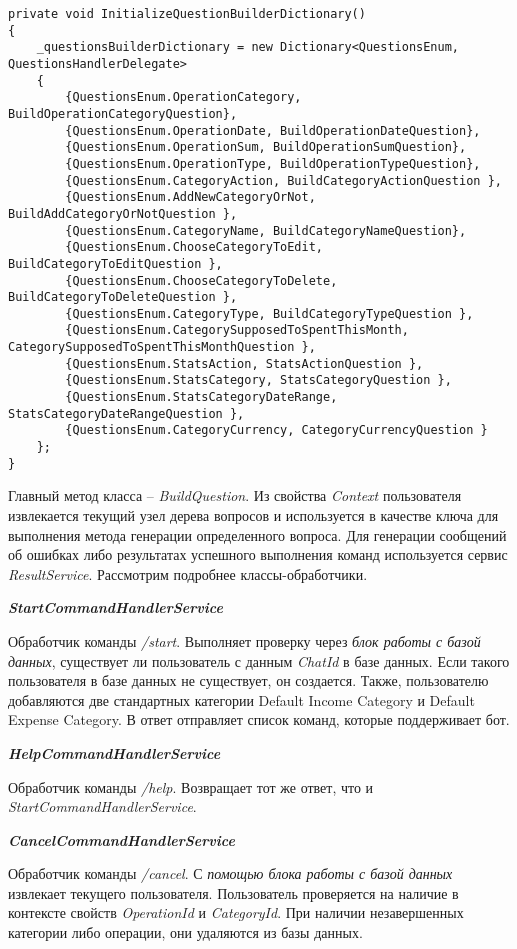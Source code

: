 \lstset{style=sharpc}
\begin{lstlisting}
private void InitializeQuestionBuilderDictionary()
{
	_questionsBuilderDictionary = new Dictionary<QuestionsEnum, QuestionsHandlerDelegate>
	{
		{QuestionsEnum.OperationCategory, BuildOperationCategoryQuestion},
		{QuestionsEnum.OperationDate, BuildOperationDateQuestion},
		{QuestionsEnum.OperationSum, BuildOperationSumQuestion},
		{QuestionsEnum.OperationType, BuildOperationTypeQuestion},
		{QuestionsEnum.CategoryAction, BuildCategoryActionQuestion },
		{QuestionsEnum.AddNewCategoryOrNot, BuildAddCategoryOrNotQuestion },
		{QuestionsEnum.CategoryName, BuildCategoryNameQuestion},
		{QuestionsEnum.ChooseCategoryToEdit, BuildCategoryToEditQuestion },
		{QuestionsEnum.ChooseCategoryToDelete, BuildCategoryToDeleteQuestion },
		{QuestionsEnum.CategoryType, BuildCategoryTypeQuestion },
		{QuestionsEnum.CategorySupposedToSpentThisMonth, CategorySupposedToSpentThisMonthQuestion },
		{QuestionsEnum.StatsAction, StatsActionQuestion },
		{QuestionsEnum.StatsCategory, StatsCategoryQuestion },
		{QuestionsEnum.StatsCategoryDateRange, StatsCategoryDateRangeQuestion },
		{QuestionsEnum.CategoryCurrency, CategoryCurrencyQuestion }
	};
}
\end{lstlisting}

Главный метод класса – \emph{BuildQuestion}. Из свойства \emph{Context} пользователя извлекается текущий узел дерева вопросов и используется в качестве ключа для выполнения метода генерации определенного вопроса.
Для генерации сообщений об ошибках либо результатах успешного выполнения команд используется сервис \emph{ResultService}.
Рассмотрим подробнее классы-обработчики.

\textbf{\emph{StartCommandHandlerService}}

Обработчик команды \emph{/start}. Выполняет проверку через \emph{блок работы с базой данных}, существует ли пользователь с данным \emph{ChatId} в базе данных. Если такого пользователя в базе данных не существует, он создается. Также, пользователю добавляются две стандартных категории Default Income Category и Default Expense Category. В ответ отправляет список команд, которые поддерживает бот.

\textbf{\emph{HelpCommandHandlerService}}

Обработчик команды \emph{/help}. Возвращает тот же ответ, что и \emph{StartCommandHandlerService}.

\textbf{\emph{CancelCommandHandlerService}}

Обработчик команды \emph{/cancel}. С \emph{помощью блока работы с базой данных} извлекает текущего пользователя. Пользователь проверяется на наличие в контексте свойств \emph{OperationId} и \emph{CategoryId}. При наличии незавершенных категории либо операции, они удаляются из базы данных.

